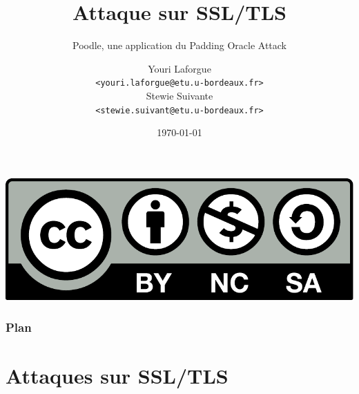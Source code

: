 %
%

\usepackage[french]{babel}

\newcommand{\highlight}[1]{\textcolor{structure.fg}{\bfseries #1}}

\title{Attaque sur SSL/TLS}
\subtitle{Poodle, une application du Padding Oracle Attack}

\author[]{Youri Laforgue\\[-.25em]
        \texttt{\scriptsize <youri.laforgue@etu.u-bordeaux.fr>}\\
        Stewie Suivante\\[-.25em]
        \texttt{\scriptsize <stewie.suivant@etu.u-bordeaux.fr>}}


\date{\today}



\begin{frame}
  \vspace{3.5em}
  \titlepage

  \begin{center}
    \includegraphics[scale=.2]{cc-by-nc-sa.pdf}
  \end{center}
\end{frame}

\begin{frame}
  \frametitle{Plan}
  \tableofcontents[subsectionstyle=hide]
\end{frame}

\section{Attaques sur SSL/TLS}

